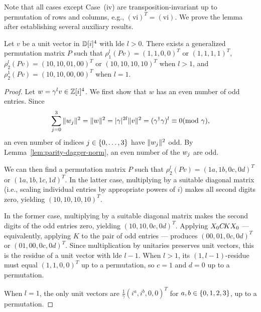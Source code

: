 \documentclass[reprint,amsmath,amssymb,aps,pra]{revtex4-2}
\begin{document}
Note that all cases except Case~(iv) are transposition-invariant up to
permutation of rows and columns, e.g., $(\text{vi})^T=(\text{vi})$. We
prove the lemma after establishing several auxiliary results.

\begin{lemma}
  \label{lem:uvec}
  Let $v$ be a unit vector in ${\mathbb D}[i]^4$ with lde $l>0$. There exists a
  generalized permutation matrix $P$ such that
  $\rho_1^l(Pv)= (1,1,0,0)^T$ or $(1,1,1,1)^T$,
  $\rho_2^l(Pv) =(10,10,01,00)^T$ or $(10,10,10,10)^T$ when $l>1$, and
  $\rho_2^1(Pv) = (10,10,00,00)^T$ when $l=1$.
\end{lemma}

\begin{proof}
  Let $w=\gamma^l v \in \mathbb{Z} [i]^4$. We first show that $w$ has an even
  number of odd entries. Since
  \[
    \sum_{j=0}^{3} \|w_j\|^2 = \|w\|^2 =
    |\gamma|^{2l}\|v\|^2 = (\gamma^{\dagger}\gamma)^l\equiv 0
    (\mathrm{mod}\ \gamma),
  \]
  an even number of indices $j \in \{0,\ldots,3\}$ have
  $\|w_j\|^2$ odd. By Lemma~\ref{lem:parity-dagger-norm}, an even
  number of the $w_j$ are odd.

  We can then find a permutation matrix $P$ such that
  $\rho_2^l(Pv)= (1a,1b,0c,0d)^T$ or $(1a,1b,1c,1d)^T$. In the latter
  case, multiplying by a suitable diagonal matrix (i.e., scaling
  individual entries by appropriate powers of $i$) makes all second
  digits zero, yielding $(10,10,10,10)^T$.

  In the former case, multiplying by a suitable diagonal matrix makes
  the second digits of the odd entries zero, yielding
  $(10,10,0c,0d)^T$. Applying $X_0C\kern-.16667em K X_0$ — equivalently, applying
  $K$ to the pair of odd entries — produces $(00,01,0c,0d)^T$ or
  $(01,00,0c,0d)^T$. Since multiplication by unitaries preserves unit
  vectors, this is the residue of a unit vector with lde $l-1$. When
  $l>1$, its $(1, l{-}1)$-residue must equal $(1,1,0,0)^T$ up to a
  permutation, so $c=1$ and $d=0$ up to a permutation.

  When $l=1$, the only unit vectors are
  $\frac{1}{\gamma}(i^a,i^b,0,0)^T$ for $a,b \in \left\{0,1,2,3\right\}$, up to a
  permutation.
\end{proof}
\end{document}
